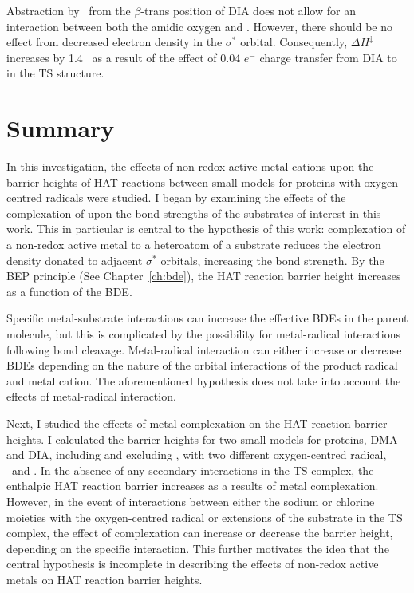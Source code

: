 \begin{doublespace}
Abstraction by \cumo\ from the $\beta$-trans position of DIA does not allow for
an interaction between both the amidic oxygen and \cumo. However, there should
be no effect from decreased electron density in the  $\sigma^*$ orbital.
Consequently, $\Delta H^\ddagger$ increases by 1.4 \kcalmol\ as a result of the
effect of 0.04 $e^-$ charge transfer from DIA to  in the TS structure.


\section{Summary}

In this investigation, the effects of non-redox active metal cations upon the
barrier heights of HAT reactions between small models for proteins with
oxygen-centred radicals were studied. I began by examining the effects of the
complexation of  upon the  bond strengths of the substrates of
interest in this work. This in particular is central to the hypothesis of this
work: complexation of a non-redox active metal to a heteroatom of a substrate
reduces the electron density donated to adjacent  $\sigma^*$ orbitals,
increasing the  bond strength. By the BEP principle (See
Chapter~\ref{ch:bde}), the HAT reaction barrier height increases as a function
of the  BDE.

Specific metal-substrate interactions can increase the effective  BDEs
in the parent molecule, but this is complicated by the possibility for
metal-radical interactions following bond cleavage. Metal-radical interaction
can either increase or decrease  BDEs depending on the nature of the
orbital interactions of the product radical and metal cation. The aforementioned
hypothesis does not take into account the effects of metal-radical interaction.

Next, I studied the effects of metal complexation on the HAT reaction barrier
heights. I calculated the barrier heights for two small models for proteins, DMA
and DIA, including and excluding , with two different oxygen-centred
radical, \bno\ and \cumo. In the absence of any secondary interactions in the TS
complex, the enthalpic HAT reaction barrier increases as a results of metal
complexation. However, in the event of interactions between either the sodium or
chlorine moieties with the oxygen-centred radical or extensions of the substrate
in the TS complex, the effect of complexation can increase or decrease the
barrier height, depending on the specific interaction. This further motivates
the idea that the central hypothesis is incomplete in describing the effects of
non-redox active metals on HAT reaction barrier heights.


\end{doublespace}
